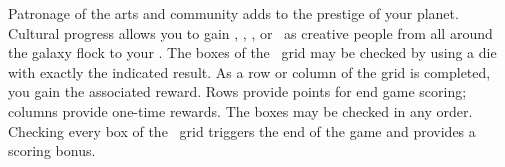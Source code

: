 Patronage of the arts and community adds to the prestige of your planet.  
Cultural progress allows you to gain \currency, \population, \tech, or 
\happiness\ as creative people from all around the galaxy flock to your \planet.
\newline\newline
The boxes of the \culture\ grid may be checked by using a die with exactly the 
indicated result.  As a row or column of the grid is completed, you gain the 
associated reward.  Rows provide points for end game scoring; columns provide 
one-time rewards.  The boxes may be checked in any order.  Checking every box of
 the \culture\ grid triggers the end of the game and provides a scoring bonus.
